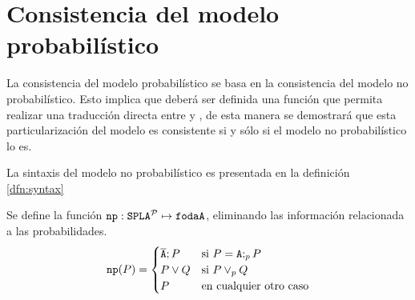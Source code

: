 \section{Consistencia del modelo probabilístico}
\label{sec:stat:consis}

La consistencia del modelo probabilístico se basa en la
consistencia del modelo no probabilístico. Esto implica
que deberá ser definida una función que permita realizar
una traducción directa entre \fodaPAp y \fodaPA,
de esta manera se demostrará que esta particularización
del modelo es consistente si y sólo si el modelo
no probabilístico lo es.


La sintaxis del modelo no probabilístico es presentada en la definición \ref{dfn:syntax}

\bdfn
  Se define la función $\mathtt{np}:\mathtt{SPLA{^{\cal P}}}\mapsto \mathtt{fodaA}$, 
  eliminando las información relacionada a las probabilidades.
  \begin{displaymath}
     \mathtt{np}(P)=
     \begin{cases}
       \overline{\mathtt{A}};P & \mathrm{si}\ P=\mathtt{A};_pP\\
       P \mathbin{\lor} Q & \mathrm{si}\ P \mathbin{\lor}_{p} Q \\
       P & \mathrm{en\ cualquier\ otro\ caso}
     \end{cases}
  \end{displaymath}
\edfn



